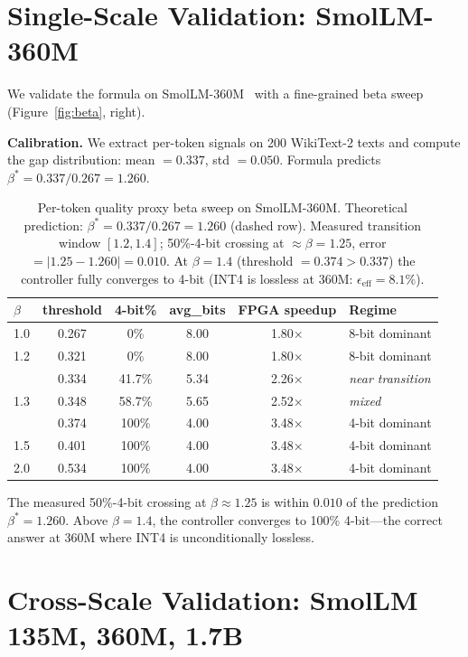 \documentclass{article}
\begin{document}
\section{Single-Scale Validation: SmolLM-360M}
\label{sec:single_scale}

We validate the formula on SmolLM-360M~\citep{smollm} with a fine-grained beta sweep
(Figure~\ref{fig:beta}, right).

\textbf{Calibration.} We extract per-token signals on 200 WikiText-2 texts and compute
the gap distribution: mean $= 0.337$, std $= 0.050$. Formula predicts $\beta^* = 0.337/0.267 = 1.260$.

\begin{table}[h]
\centering
\caption{Per-token quality proxy beta sweep on SmolLM-360M. Theoretical prediction:
$\beta^* = 0.337/0.267 = 1.260$ (dashed row). Measured transition window $[1.2, 1.4]$;
50\%-4-bit crossing at $\approx\beta{=}1.25$, error $= |1.25 - 1.260| = 0.010$.
At $\beta=1.4$ (threshold $= 0.374 > 0.337$) the controller fully converges to 4-bit
(INT4 is lossless at 360M: $\epsilon_\text{eff}=8.1\%$).}
\begin{tabular}{lccccl}
\toprule
$\beta$ & threshold & 4-bit\% & avg\_bits & FPGA speedup & Regime \\
\midrule
1.0   & 0.267 & 0\%    & 8.00 & 1.80$\times$ & 8-bit dominant \\
1.2   & 0.321 & 0\%    & 8.00 & 1.80$\times$ & 8-bit dominant \\
\hdashline
1.25  & 0.334 & 41.7\% & 5.34 & 2.26$\times$ & \textit{near transition} \\
1.3   & 0.348 & 58.7\% & 5.65 & 2.52$\times$ & \textit{mixed} \\
\hdashline
1.4   & 0.374 & 100\%  & 4.00 & 3.48$\times$ & 4-bit dominant \\
1.5   & 0.401 & 100\%  & 4.00 & 3.48$\times$ & 4-bit dominant \\
2.0   & 0.534 & 100\%  & 4.00 & 3.48$\times$ & 4-bit dominant \\
\bottomrule
\end{tabular}
\label{tab:pertok_sweep}
\end{table}

The measured 50\%-4-bit crossing at $\beta\approx1.25$ is within $0.010$ of the prediction
$\beta^* = 1.260$. Above $\beta=1.4$, the controller converges to 100\% 4-bit---the
correct answer at 360M where INT4 is unconditionally lossless.

\section{Cross-Scale Validation: SmolLM 135M, 360M, 1.7B}
\label{sec:cross_scale}
\end{document}
